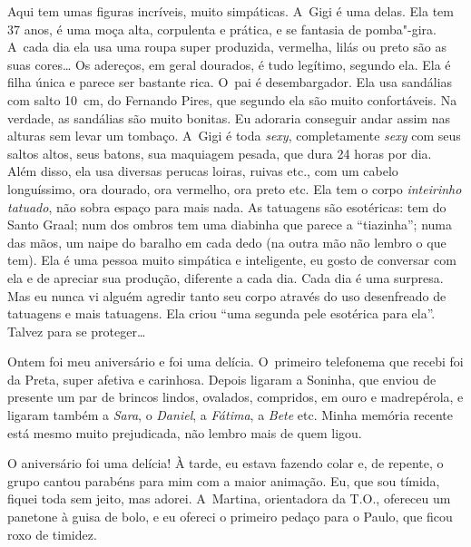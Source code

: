 Aqui tem umas figuras incríveis, muito simpáticas. A~Gigi é uma delas.
Ela tem 37 anos, é uma moça alta, corpulenta e prática, e se fantasia de
pomba"-gira. A~cada dia ela usa uma roupa super produzida, vermelha,
lilás ou preto são as suas cores… Os adereços, em geral dourados,
é tudo legítimo, segundo ela. Ela é filha única e parece ser bastante
rica. O~pai é desembargador. Ela usa sandálias com salto 10\, cm, do
Fernando Pires, que segundo ela são muito confortáveis. Na verdade, as
sandálias são muito bonitas. Eu adoraria conseguir andar assim nas
alturas sem levar um tombaço. A~Gigi é toda \emph{sexy}, completamente
\emph{sexy} com seus saltos altos, seus batons, sua maquiagem pesada,
que dura 24 horas por dia. Além disso, ela usa diversas perucas loiras,
ruivas etc., com um cabelo longuíssimo, ora dourado, ora vermelho, ora
preto etc. Ela tem o corpo \emph{inteirinho tatuado}, não sobra espaço
para mais nada. As tatuagens são esotéricas: tem do Santo Graal; num dos
ombros tem uma diabinha que parece a ``tiazinha''; numa das mãos, um
naipe do baralho em cada dedo (na outra mão não lembro o que tem). Ela é
uma pessoa muito simpática e inteligente, eu gosto de conversar com ela
e de apreciar sua produção, diferente a cada dia. Cada dia é uma
surpresa. Mas eu nunca vi alguém agredir tanto seu corpo através do uso
desenfreado de tatuagens e mais tatuagens. Ela criou ``uma segunda pele
esotérica para ela''. Talvez para se proteger…

Ontem foi meu aniversário e foi uma delícia. O~primeiro telefonema que
recebi foi da Preta, super afetiva e carinhosa. Depois ligaram a
Soninha, que enviou de presente um par de brincos lindos, ovalados,
compridos, em ouro e madrepérola, e ligaram também a \emph{Sara}, o
\emph{Daniel}, a \emph{Fátima}, a \emph{Bete} etc. Minha memória recente
está mesmo muito prejudicada, não lembro mais de quem ligou.

O aniversário foi uma delícia! À tarde, eu estava fazendo colar e, de
repente, o grupo cantou parabéns para mim com a maior animação. Eu, que
sou tímida, fiquei toda sem jeito, mas adorei. A~Martina, orientadora da
T.O., ofereceu um panetone à guisa de bolo, e eu ofereci o primeiro
pedaço para o Paulo, que ficou roxo de timidez.

